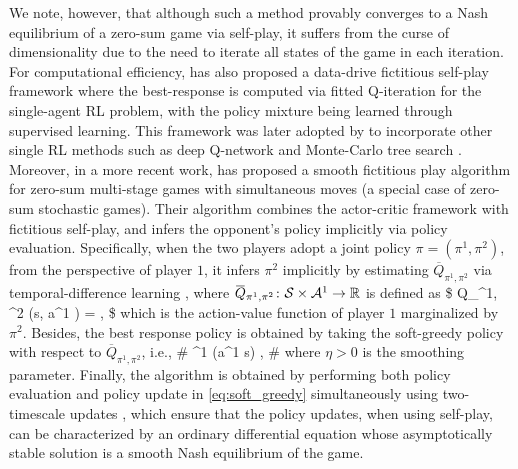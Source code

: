  We note, however, that although such a method provably converges to a Nash equilibrium of a zero-sum game via self-play, it suffers from the curse of dimensionality due to the need to iterate all states of the game in each iteration. For computational efficiency, \cite{heinrich2015fictitious} has also proposed a data-drive fictitious self-play framework where the best-response is computed via  fitted Q-iteration \cite{ernst2005tree, munos2007performance}  for the single-agent RL problem,  with the policy mixture being  learned through   supervised learning. This framework was later  adopted by  \cite{heinrich2014self, heinrich2016deep, kawamura2017neural,  zhang2019monte} to incorporate other single RL methods such as deep Q-network \cite{mnih2015human} and Monte-Carlo tree search  \cite{coulom2006efficient, kocsis2006bandit, browne2012survey}. Moreover, in a more recent work, \cite{perolat2018actor} has proposed a smooth fictitious  play algorithm \cite{fudenberg1995consistency} for zero-sum multi-stage games with simultaneous moves (a special case of zero-sum stochastic games). 
 Their algorithm combines the 
 actor-critic  framework \cite{konda2000actor}  with fictitious self-play, and infers the  opponent's policy implicitly via policy evaluation. Specifically, when the two players 
 adopt a joint policy $\pi = (\pi^1, \pi^2)$,  
 from the perspective of player $1$,  it infers $\pi^2$ implicitly by estimating $  \overbar Q _{\pi^1, \pi^2} $ via temporal-difference learning  \cite{sutton1987temporal}, where $ \overbar Q_{\pi^1, \pi^2} \colon \cS \times \cA^1 \rightarrow \RR$ is defined as 
 \$
 \overbar Q_{\pi^1, \pi^2} (s, a^1 ) = \EE\bigg[\sum_{t\geq 0}\gamma^t R^1(s_t,a_t,s_{t+1})\bigggiven s_0 = s, a_0^1 = a^1, a_0^2 \sim \pi^2 (\cdot \given  s) , a_t\sim \pi(\cdot\given s_t), \forall t\geq 1  \bigg] ,
 \$
 which is 
  the action-value function of player $1$ marginalized by $\pi^2$. Besides, the best response policy is obtained by taking the soft-greedy policy with respect to $\overbar Q_{\pi^1, \pi^2} $, i.e.,
  \#\label{eq:soft_greedy}
  \pi^1 (a^1  \given s)  \leftarrow {} ,
  \#
  where $\eta>0$ is the  smoothing parameter.  Finally, the algorithm is obtained by performing both policy evaluation and policy update in  \eqref{eq:soft_greedy} simultaneously using two-timescale updates \cite{borkar2008stochastic,kushner2003stochastic}, which ensure that the   policy updates, when using self-play, can be characterized by an ordinary differential equation whose asymptotically stable solution is 
  a smooth Nash equilibrium of the game.
 

